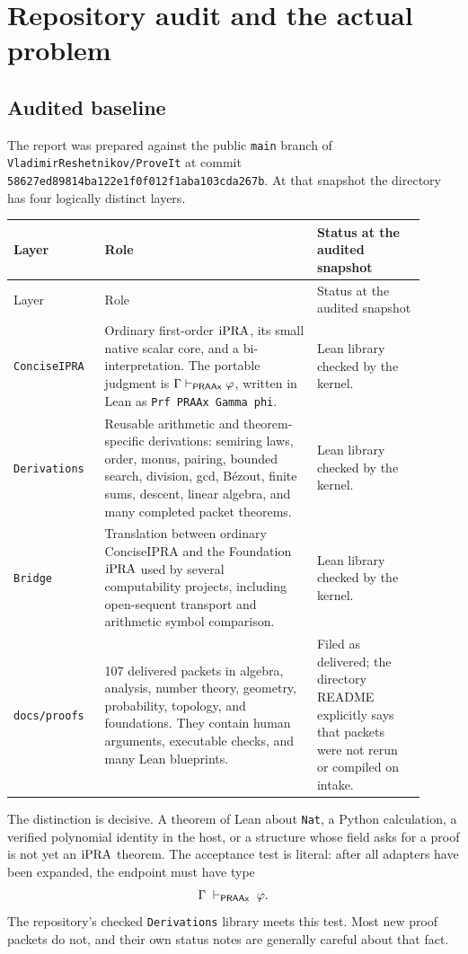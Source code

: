 \section{Repository audit and the actual problem}
\label{sec:audit}

\subsection{Audited baseline}

The report was prepared against the public \texttt{main} branch of
\texttt{VladimirReshetnikov/ProveIt} at commit
\texttt{58627ed89814ba122e1f0f012f1aba10\allowbreak 3cda267b}.  At that
snapshot the  directory has four logically
distinct layers.

\begin{longtable}{p{0.20\linewidth}p{0.47\linewidth}p{0.24\linewidth}}
\toprule
Layer & Role & Status at the audited snapshot\\
\midrule
\endfirsthead
\toprule
Layer & Role & Status at the audited snapshot\\
\midrule
\endhead
\texttt{ConciseIPRA} & Ordinary first-order \(\mathrm{iPRA}\), its small native scalar core, and a bi-interpretation.  The portable judgment is \(\Gamma\vdash_{\mathsf{PRAAx}}\varphi\), written in Lean as \texttt{Prf PRAAx Gamma phi}. & Lean library checked by the kernel.\\
\texttt{Derivations} & Reusable arithmetic and theorem-specific derivations: semiring laws, order, monus, pairing, bounded search, division, gcd, B\'ezout, finite sums, descent, linear algebra, and many completed packet theorems. & Lean library checked by the kernel.\\
\texttt{Bridge} & Translation between ordinary ConciseIPRA and the Foundation \(\mathrm{iPRA}\) used by several computability projects, including open-sequent transport and arithmetic symbol comparison. & Lean library checked by the kernel.\\
\texttt{docs/proofs} & 107 delivered packets in algebra, analysis, number theory, geometry, probability, topology, and foundations.  They contain human arguments, executable checks, and many Lean blueprints. & Filed as delivered; the directory README explicitly says that packets were not rerun or compiled on intake.\\
\bottomrule
\end{longtable}

The distinction is decisive.  A theorem of Lean about \texttt{Nat}, a Python
calculation, a verified polynomial identity in the host, or a structure whose
field asks for a proof is not yet an \(\mathrm{iPRA}\) theorem.  The acceptance test is
literal: after all adapters have been expanded, the endpoint must have type
\[
        \Gamma\;\vdash_{\mathsf{PRAAx}}\;\varphi.
\]
The repository's checked \texttt{Derivations} library meets this test.  Most
new proof packets do not, and their own status notes are generally careful
about that fact.

